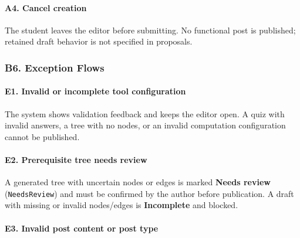 \documentclass[12pt]{article}
\begin{document}
\paragraph*{A4. Cancel creation}
\par\medskip

The student leaves the editor before submitting. No functional post is published; retained draft behavior is not specified in proposals.
\par\medskip

\hypertarget{sec:b6-exception-flows}{}
\subsubsection*{B6. Exception Flows}
\par\medskip

\hypertarget{sec:e1-invalid-or-incomplete-tool-configuration}{}
\paragraph*{E1. Invalid or incomplete tool configuration}
\par\medskip

The system shows validation feedback and keeps the editor open. A quiz with invalid answers, a tree with no nodes, or an invalid computation configuration cannot be published.
\par\medskip

\hypertarget{sec:e2-prerequisite-tree-needs-review}{}
\paragraph*{E2. Prerequisite tree needs review}
\par\medskip

A generated tree with uncertain nodes or edges is marked \textbf{Needs review} (\texttt{NeedsReview}) and must be confirmed by the author before publication. A draft with missing or invalid nodes/edges is \textbf{Incomplete} and blocked.
\par\medskip

\hypertarget{sec:e3-invalid-post-content-or-post-type}{}
\paragraph*{E3. Invalid post content or post type}
\par\medskip
\end{document}

